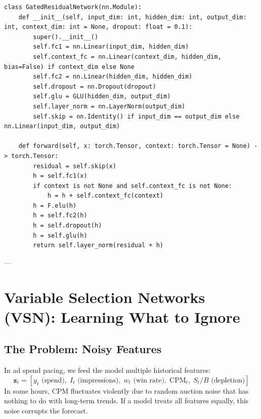 \documentclass[11pt,a4paper]{article}
\begin{document}
\begin{codebox}
\begin{lstlisting}
class GatedResidualNetwork(nn.Module):
    def __init__(self, input_dim: int, hidden_dim: int, output_dim: int, context_dim: int = None, dropout: float = 0.1):
        super().__init__()
        self.fc1 = nn.Linear(input_dim, hidden_dim)
        self.context_fc = nn.Linear(context_dim, hidden_dim, bias=False) if context_dim else None
        self.fc2 = nn.Linear(hidden_dim, hidden_dim)
        self.dropout = nn.Dropout(dropout)
        self.glu = GLU(hidden_dim, output_dim)
        self.layer_norm = nn.LayerNorm(output_dim)
        self.skip = nn.Identity() if input_dim == output_dim else nn.Linear(input_dim, output_dim)

    def forward(self, x: torch.Tensor, context: torch.Tensor = None) -> torch.Tensor:
        residual = self.skip(x)
        h = self.fc1(x)
        if context is not None and self.context_fc is not None:
            h = h + self.context_fc(context)
        h = F.elu(h)
        h = self.fc2(h)
        h = self.dropout(h)
        h = self.glu(h)
        return self.layer_norm(residual + h)
\end{lstlisting}
\end{codebox}

---

\section{Variable Selection Networks (VSN): Learning What to Ignore}

\subsection{The Problem: Noisy Features}
In ad spend pacing, we feed the model multiple historical features:
\begin{equation}
    \mathbf{z}_t = [y_t \text{ (spend)}, \; I_t \text{ (impressions)}, \; w_t \text{ (win rate)}, \; \text{CPM}_t, \; S_t/B \text{ (depletion)}]
\end{equation}
In some hours, CPM fluctuates violently due to random auction noise that has nothing to do with long-term trends. If a model treats all features equally, this noise corrupts the forecast.
\end{document}
